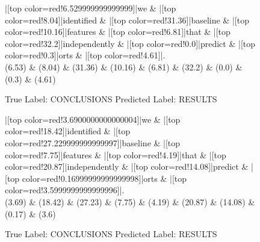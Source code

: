 \documentclass[a4paper, landscape]{article}
\begin{document}
\begin{figure}
\begin{center}
\begin{dependency}
\begin{deptext}
|[top color=red!6.529999999999999]|we \& |[top color=red!8.04]|identified \& |[top color=red!31.36]|baseline \& |[top color=red!10.16]|features \& |[top color=red!6.81]|that \& |[top color=red!32.2]|independently \& |[top color=red!0.0]|predict \& |[top color=red!0.3]|orts \& |[top color=red!4.61]|.\\
(6.53) \& (8.04) \& (31.36) \& (10.16) \& (6.81) \& (32.2) \& (0.0) \& (0.3) \& (4.61)\\
\end{deptext}
\end{dependency}
\end{center}
\caption{True Label: CONCLUSIONS Predicted Label: RESULTS}
\end{figure}
\clearpage
\begin{figure}
\begin{center}
\begin{dependency}
\begin{deptext}
|[top color=red!3.6900000000000004]|we \& |[top color=red!18.42]|identified \& |[top color=red!27.229999999999997]|baseline \& |[top color=red!7.75]|features \& |[top color=red!4.19]|that \& |[top color=red!20.87]|independently \& |[top color=red!14.08]|predict \& |[top color=red!0.16999999999999998]|orts \& |[top color=red!3.5999999999999996]|.\\
(3.69) \& (18.42) \& (27.23) \& (7.75) \& (4.19) \& (20.87) \& (14.08) \& (0.17) \& (3.6)\\
\end{deptext}
\end{dependency}
\end{center}
\caption{True Label: CONCLUSIONS Predicted Label: RESULTS}
\end{figure}
\clearpage
\end{document}
